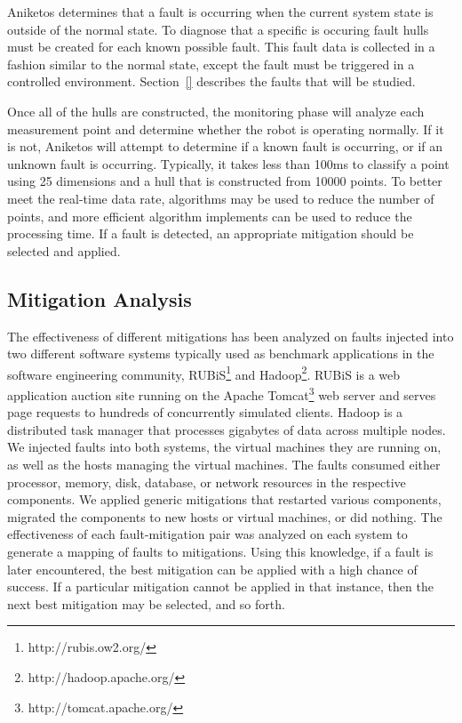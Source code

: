 Aniketos determines that a fault is occurring when the current system state is outside of the normal state. To diagnose that a specific is occuring fault hulls must be created for each known possible fault. This fault data is collected in a fashion similar to the normal state, except the fault must be triggered in a controlled environment. Section~\ref{} describes the faults that will be studied.

Once all of the hulls are constructed, the monitoring phase will analyze each measurement point and determine whether the robot is operating normally. If it is not, Aniketos will attempt to determine if a known fault is occurring, or if an unknown fault is occurring. Typically, it takes less than 100ms to classify a point using 25 dimensions and a hull that is constructed from 10000 points. To better meet the real-time data rate, algorithms may be used to reduce the number of points, and more efficient algorithm implements can be used to reduce the processing time. If a fault is detected, an appropriate mitigation should be selected and applied.

\subsection{Mitigation Analysis}
\label{sub:mitigationanalysis}
The effectiveness of different mitigations has been analyzed on faults injected into two different software systems typically used as benchmark applications in the software engineering community, RUBiS\footnote{http://rubis.ow2.org/} and Hadoop\footnote{http://hadoop.apache.org/}. RUBiS is a web application auction site running on the Apache Tomcat\footnote{http://tomcat.apache.org/} web server and serves page requests to hundreds of concurrently simulated clients. Hadoop is a distributed task manager that processes gigabytes of data across multiple nodes. We injected faults into both systems, the virtual machines they are running on, as well as the hosts managing the virtual machines. The faults consumed either processor, memory, disk, database, or network resources in the respective components. We applied generic mitigations that restarted various components, migrated the components to new hosts or virtual machines, or did nothing. The effectiveness of each fault-mitigation pair was analyzed on each system to generate a mapping of faults to mitigations. Using this knowledge, if a fault is later encountered, the best mitigation can be applied with a high chance of success. If a particular mitigation cannot be applied in that instance, then the next best mitigation may be selected, and so forth.


